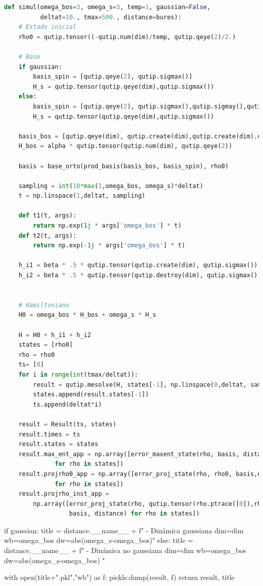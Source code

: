 \documentclass{report} %
\numberwithin{equation}{section}
\begin{document}
\begin{lstlisting}[language=Python]
def simul(omega_bos=3, omega_s=3, temp=1, gaussian=False,         
          deltat=10., tmax=500., distance=bures):
    # Estado inicial
    rho0 = qutip.tensor((-qutip.num(dim)/temp, qutip.qeye(2)/2.) 
    
    # Base
    if gaussian:
        basis_spin = [qutip.qeye(2), qutip.sigmax()]
        H_s = qutip.tensor(qutip.qeye(dim),qutip.sigmax())
    else:
        basis_spin = [qutip.qeye(2), qutip.sigmax(),qutip.sigmay(),qutip.sigmaz()]
        H_s = qutip.tensor(qutip.qeye(dim),qutip.sigmax())
        
    basis_bos = [qutip.qeye(dim), qutip.create(dim),qutip.create(dim).dag(),qutip.num(dim)]
    H_bos = alpha * qutip.tensor(qutip.num(dim), qutip.qeye(2))
    
    basis = base_orto(prod_basis(basis_bos, basis_spin), rho0)
    
    sampling = int(10*max(1,omega_bos, omega_s)*deltat)
    t = np.linspace(1,deltat, sampling)
    
    def t1(t, args):
        return np.exp(1j * args['omega_bos'] * t) 
    def t2(t, args):
        return np.exp(-1j * args['omega_bos'] * t) 
    
    h_i1 = beta * .5 * qutip.tensor(qutip.create(dim), qutip.sigmax())
    h_i2 = beta * .5 * qutip.tensor(qutip.destroy(dim), qutip.sigmax())

    
    # Hamiltoniano
    H0 = omega_bos * H_bos + omega_s * H_s 
   
    H = H0 + h_i1 + h_i2
    states = [rho0]
    rho = rho0    
    ts= [0]
    for i in range(int(tmax/deltat)):
        result = qutip.mesolve(H, states[-1], np.linspace(0,deltat, sampling))
        states.append(result.states[-1])
        ts.append(deltat*i)

    result = Result(ts, states)
    result.times = ts
    result.states = states
    result.max_ent_app = np.array([error_maxent_state(rho, basis, distance) 
              for rho in states])
    result.projrho0_app = np.array([error_proj_state(rho, rho0, basis,distance) 
              for rho in states])
    result.projrho_inst_app =
        np.array([error_proj_state(rho, qutip.tensor(rho.ptrace([0]),rho.ptrace([1])), 
                  basis, distance) for rho in states])
\end{lstlisting}
\begin{Omitir}
    if gaussian:
        title = distance.__name__ +
                f" - Dinámica gaussiana dim={dim} wb={omega_bos} dw={abs(omega_s-omega_bos)}"
    else:
        title = distance.__name__ + 
                f" - Dinámica no gaussiana dim={dim} wb={omega_bos}
                      dw={abs(omega_s-omega_bos)} " 

    with open(title+".pkl","wb") as f:
        pickle.dump(result, f)
    return result, title
\end{Omitir}
\end{document}
